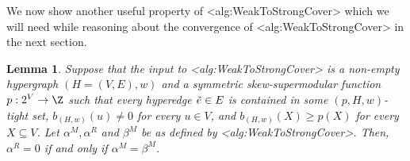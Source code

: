 \documentclass{article}
\def\Cref#1{<#1>}%
\newtheorem{lemma}{Lemma}[section]
\newcommand{\tightSetFamily}[1]{\ensuremath{T_{#1}}\xspace}
\begin{document}
We now show another useful property of \Cref{alg:WeakToStrongCover} which we will need while reasoning about the convergence of \Cref{alg:WeakToStrongCover} in the next section.
\begin{lemma}\label{lem:WeakToStrong:alpha^R=0-iff-alpha^M=beta^M}
Suppose that the input to \Cref{alg:WeakToStrongCover} is a non-empty hypergraph $(H = (V, E), w)$ and a symmetric skew-supermodular function $p:2^V\rightarrow \Z$
such that every hyperedge $\Tilde{e} \in E$ is contained in some $(p, H, w)$-tight set, $b_{(H,w)}(u) \not = 0$ for every $u \in V$, and $b_{(H,w)}(X) \geq p(X)$ for every $X \subseteq V$. 
 Let $\alpha^M, \alpha^R$ and $\beta^M$ be as defined by \Cref{alg:WeakToStrongCover}.  
 Then, $\alpha^R = 0$ if and only if $\alpha^M = \beta^M$.
\end{lemma}
\end{document}
